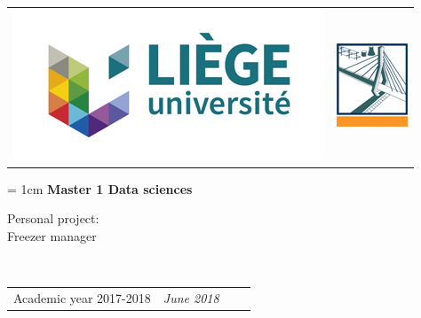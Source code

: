 \documentclass[a4paper, 10pt]{article}
\begin{document}

\begin{titlepage}

 	\begin{tabular}{p{11cm}p{8cm}}    
       		\includegraphics[scale=0.4]{logo_ulg.png}  &\raggedright{\includegraphics[scale=0.6]{Logo_FSAnew.png}}\\
         \end{tabular}
         
         	\begin{center}
		\unitlength = 1cm
         		\vspace{0.1cm}
         		\Large\textbf{Master 1 Data sciences}\\
         		\vspace{2.5cm}

{Personal project:}\\
\vspace*{0.5cm}
\Large Freezer manager
	\end{center}

      	\vspace*{2cm}
        \begin{center}
\end{center}
\vspace{2cm}
    \\
	      	\vspace{2.5cm}

	
	\begin{tabular}{p{12cm}p{12cm} l r}    
       		Academic year 2017-2018
       		&\raggedright{\large \noindent \textsl{June 2018}}
         \end{tabular}
   \end{titlepage}
   \setcounter{page}{1}


\newpage
\tableofcontents
\newpage

\end{document}

